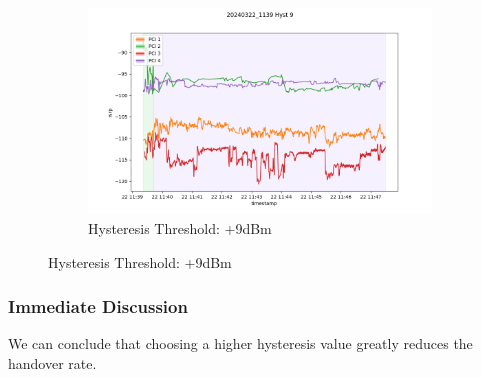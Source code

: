 \begin{figure}[p]
    \begin{subfigure}{\linewidth}
        \centering
        \includegraphics[width=0.6\linewidth]{src//img/5hyst9.png}
        \caption{Hysteresis Threshold: +9dBm}
        \label{fig:methods:hyst9}
    \end{subfigure}
\end{figure}

\subsubsection{Immediate Discussion}
We can conclude that choosing a higher hysteresis value greatly reduces the handover rate.